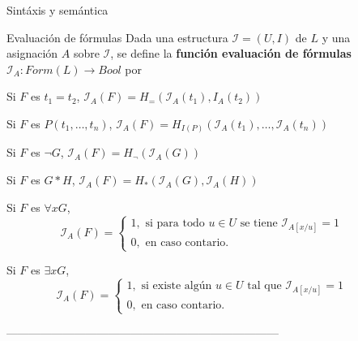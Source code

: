 \documentclass[final]{beamer}
\newlength{\sepwid}
\newlength{\onecolwid}
\begin{document}
\begin{frame}[t,fragile]
\begin{columns}[t]
\begin{column}{\onecolwid}
\begin{block}{Sintáxis y semántica}
\end{block}
\begin{block}{Evaluación de fórmulas}
  Dada una estructura $\mathcal{I} = (U,I)$ de $L$ y una asignación
  $A$ sobre $\mathcal{I}$, se define la \textbf{función evaluación de fórmulas}
  $\mathcal{I}_A: Form(L) \rightarrow Bool$ por
  \begin{itemize*}
  \item Si $F$ es $t_1=t_2$,  
    $\mathcal{I}_A(F) = H_=(\mathcal{I}_A(t_1),I_A(t_2))$
  \item Si $F$ es $P(t_1,\dots ,t_n)$,  
    $\mathcal{I}_A(F) = H_{I(P)}(\mathcal{I}_A(t_1), \dots ,\mathcal{I}_A(t_n))$
  \item Si $F$ es $\neg G$, 
    $\mathcal{I}_A(F) = H_{\neg}(\mathcal{I}_A(G))$
  \item Si $F$ es $G*H$, 
    $\mathcal{I}_A(F) = H_*(\mathcal{I}_A(G),\mathcal{I}_A(H))$
  \item Si $F$ es $\forall x G$,
    \begin{equation*}
      \mathcal{I}_A(F) = \left\{
      \begin{array}{ll} 
        1, \text{ si para todo } u \in U \text{ se tiene } \mathcal{I}_{A [ x / u ]} = 1 \\
        0, \text{ en caso contario}.
      \end{array} \right.
    \end{equation*}
  \item Si $F$ es $\exists x G$,
     \begin{equation*}
      \mathcal{I}_A(F) = \left\{
      \begin{array}{ll}
        1, \text{ si existe algún } u \in U \text{ tal que } 
           \mathcal{I}_{A [x / u ]} = 1 \\
        0, \text{ en caso contario}.
      \end{array} \right.
    \end{equation*}
  \end{itemize*}
\end{block}


 
------------------------------------------------------------------------

\end{column} %

\begin{column}{\sepwid}\end{column} %


\end{columns}
\end{frame}
\end{document}
